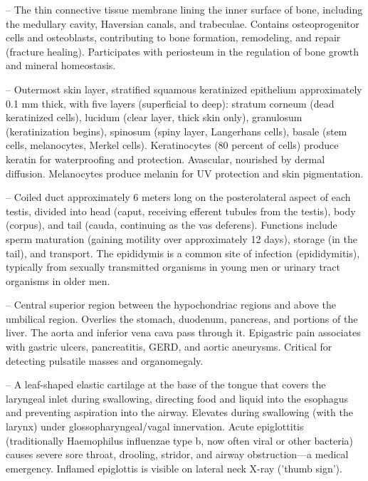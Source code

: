 -- The thin connective tissue membrane lining the inner surface of bone, including the medullary cavity, Haversian canals, and trabeculae. Contains osteoprogenitor cells and osteoblasts, contributing to bone formation, remodeling, and repair (fracture healing). Participates with periosteum in the regulation of bone growth and mineral homeostasis.

-- Outermost skin layer, stratified squamous keratinized epithelium approximately 0.1 mm thick, with five layers (superficial to deep): stratum corneum (dead keratinized cells), lucidum (clear layer, thick skin only), granulosum (keratinization begins), spinosum (spiny layer, Langerhans cells), basale (stem cells, melanocytes, Merkel cells). Keratinocytes (80 percent of cells) produce keratin for waterproofing and protection. Avascular, nourished by dermal diffusion. Melanocytes produce melanin for UV protection and skin pigmentation.

-- Coiled duct approximately 6 meters long on the posterolateral aspect of each testis, divided into head (caput, receiving efferent tubules from the testis), body (corpus), and tail (cauda, continuing as the vas deferens). Functions include sperm maturation (gaining motility over approximately 12 days), storage (in the tail), and transport. The epididymis is a common site of infection (epididymitis), typically from sexually transmitted organisms in young men or urinary tract organisms in older men.

-- Central superior region between the hypochondriac regions and above the umbilical region. Overlies the stomach, duodenum, pancreas, and portions of the liver. The aorta and inferior vena cava pass through it. Epigastric pain associates with gastric ulcers, pancreatitis, GERD, and aortic aneurysms. Critical for detecting pulsatile masses and organomegaly.

-- A leaf-shaped elastic cartilage at the base of the tongue that covers the laryngeal inlet during swallowing, directing food and liquid into the esophagus and preventing aspiration into the airway. Elevates during swallowing (with the larynx) under glossopharyngeal/vagal innervation. Acute epiglottitis (traditionally Haemophilus influenzae type b, now often viral or other bacteria) causes severe sore throat, drooling, stridor, and airway obstruction—a medical emergency. Inflamed epiglottis is visible on lateral neck X-ray ('thumb sign').

